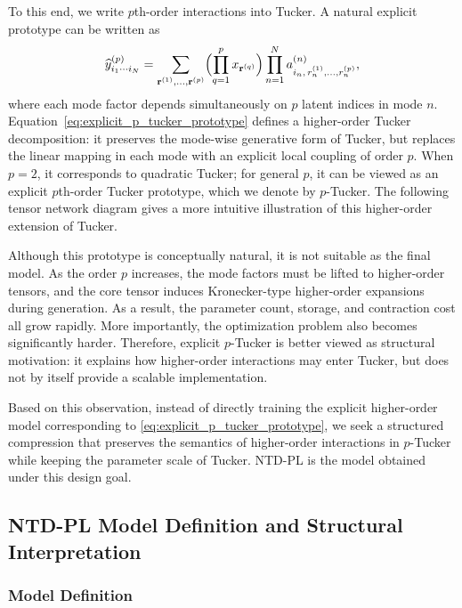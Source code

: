 To this end, we write $p$th-order interactions into Tucker. A natural explicit prototype can be written as
\begin{equation}
\label{eq:explicit_p_tucker_prototype}
\widehat y^{(p)}_{i_1\cdots i_N}
=
\sum_{\mathbf r^{(1)},\dots,\mathbf r^{(p)}}
\Bigl(\prod_{q=1}^{p} x_{\mathbf r^{(q)}}\Bigr)
\prod_{n=1}^{N}
 a^{(n)}_{i_n,\,r_n^{(1)},\dots,r_n^{(p)}},
\end{equation}
where each mode factor depends simultaneously on $p$ latent indices in mode $n$. Equation~\eqref{eq:explicit_p_tucker_prototype} defines a higher-order Tucker decomposition: it preserves the mode-wise generative form of Tucker, but replaces the linear mapping in each mode with an explicit local coupling of order $p$. When $p=2$, it corresponds to quadratic Tucker; for general $p$, it can be viewed as an explicit $p$th-order Tucker prototype, which we denote by $p$-Tucker. The following tensor network diagram gives a more intuitive illustration of this higher-order extension of Tucker.
\begin{center}
\resizebox{\linewidth}{!}{}
\end{center}

Although this prototype is conceptually natural, it is not suitable as the final model. As the order $p$ increases, the mode factors must be lifted to higher-order tensors, and the core tensor induces Kronecker-type higher-order expansions during generation. As a result, the parameter count, storage, and contraction cost all grow rapidly. More importantly, the optimization problem also becomes significantly harder. Therefore, explicit $p$-Tucker is better viewed as structural motivation: it explains how higher-order interactions may enter Tucker, but does not by itself provide a scalable implementation.

Based on this observation, instead of directly training the explicit higher-order model corresponding to \eqref{eq:explicit_p_tucker_prototype}, we seek a structured compression that preserves the semantics of higher-order interactions in $p$-Tucker while keeping the parameter scale of Tucker. NTD-PL is the model obtained under this design goal.

\subsection{NTD-PL Model Definition and Structural Interpretation}

\subsubsection{Model Definition}

